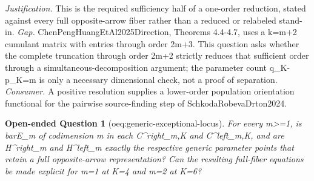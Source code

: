 \documentclass{article}
\newtheorem{openendedquestion}{Open-ended Question}
\begin{document}
\par\smallskip\noindent \textit{Justification.} This is the required sufficiency half of a one-order reduction, stated against every full opposite-arrow fiber rather than a reduced or relabeled stand-in. \textit{Gap.} ChenPengHuangEtAl2025Direction, Theorems 4.4-4.7, uses a k=m+2 cumulant matrix with entries through order 2m+3. This question asks whether the complete truncation through order 2m+2 strictly reduces that sufficient order through a simultaneous-decomposition argument; the parameter count q_K-p_K=m is only a necessary dimensional check, not a proof of separation. \textit{Consumer.} A positive resolution supplies a lower-order population orientation functional for the pairwise source-finding step of SchkodaRobevaDrton2024.

\begin{openendedquestion}[oeq:generic-exceptional-locus]\label{oeq:generic-exceptional-locus}
For every m>=1, is barE_m of codimension m in each C^right_{m,K} and C^left_{m,K}, and are H^right_m and H^left_m exactly the respective generic parameter points that retain a full opposite-arrow representation? Can the resulting full-fiber equations be made explicit for m=1 at K=4 and m=2 at K=6?
\end{openendedquestion}
\end{document}
